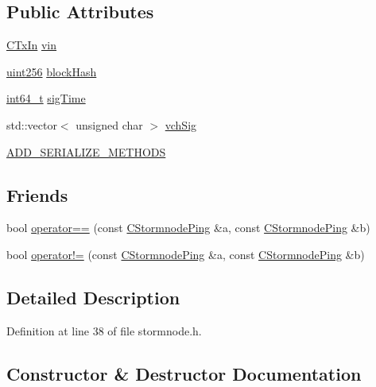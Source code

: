 \subsection*{Public Attributes}
\begin{DoxyCompactItemize}
\item 
\hyperlink{class_c_tx_in}{C\+Tx\+In} \hyperlink{class_c_stormnode_ping_a83adfd5f2331b88deb60e44df9c878d9}{vin}
\item 
\hyperlink{classuint256}{uint256} \hyperlink{class_c_stormnode_ping_a8a77ddaf2c49e48d306c05022e4e6b28}{block\+Hash}
\item 
\hyperlink{stdint_8h_adec1df1b8b51cb32b77e5b86fff46471}{int64\+\_\+t} \hyperlink{class_c_stormnode_ping_a9444c0ea28227eac0f3b3a0266ce0e9e}{sig\+Time}
\item 
std\+::vector$<$ unsigned char $>$ \hyperlink{class_c_stormnode_ping_af0e27eadd1e12a8c75540c012d835ce1}{vch\+Sig}
\item 
\hyperlink{class_c_stormnode_ping_af7de3b992f923d3fef5d2796264c1698}{A\+D\+D\+\_\+\+S\+E\+R\+I\+A\+L\+I\+Z\+E\+\_\+\+M\+E\+T\+H\+O\+D\+S}
\end{DoxyCompactItemize}
\subsection*{Friends}
\begin{DoxyCompactItemize}
\item 
bool \hyperlink{class_c_stormnode_ping_ab11e655925feefb19b90952072ae8371}{operator==} (const \hyperlink{class_c_stormnode_ping}{C\+Stormnode\+Ping} \&a, const \hyperlink{class_c_stormnode_ping}{C\+Stormnode\+Ping} \&b)
\item 
bool \hyperlink{class_c_stormnode_ping_adeed36dead5e3d3b539466408bee7915}{operator!=} (const \hyperlink{class_c_stormnode_ping}{C\+Stormnode\+Ping} \&a, const \hyperlink{class_c_stormnode_ping}{C\+Stormnode\+Ping} \&b)
\end{DoxyCompactItemize}


\subsection{Detailed Description}


Definition at line 38 of file stormnode.\+h.



\subsection{Constructor \& Destructor Documentation}
\hypertarget{class_c_stormnode_ping_a68d6a920cf9edf6abdd95daf7001c309}{}
